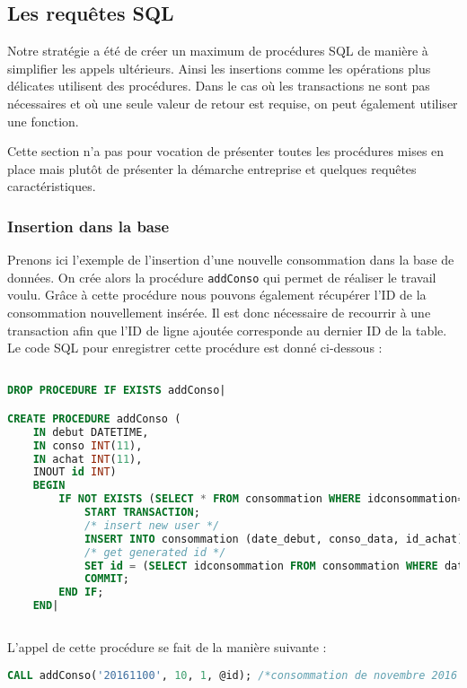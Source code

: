 \subsection{Les requêtes SQL}
Notre stratégie a été de créer un maximum de procédures SQL de manière à simplifier les appels ultérieurs. Ainsi les insertions comme les opérations plus délicates utilisent des procédures.
Dans le cas où les transactions ne sont pas nécessaires et où une seule valeur de retour est requise, on peut également utiliser une fonction.

Cette section n'a pas pour vocation de présenter toutes les procédures mises en place mais plutôt de présenter la démarche entreprise et quelques requêtes caractéristiques.
\subsubsection{Insertion dans la base}
Prenons ici l'exemple de l'insertion d'une nouvelle consommation dans la base de données. On crée alors la procédure \texttt{addConso} qui permet de réaliser le travail voulu. Grâce à cette procédure nous pouvons également récupérer l'ID de la consommation nouvellement insérée.
Il est donc nécessaire de recourrir à une transaction afin que l'ID de ligne ajoutée corresponde au dernier ID de la table. Le code SQL pour enregistrer cette procédure est donné ci-dessous :

\begin{lstlisting}[language=sql]

DROP PROCEDURE IF EXISTS addConso|

CREATE PROCEDURE addConso (
    IN debut DATETIME,
    IN conso INT(11),
    IN achat INT(11),
    INOUT id INT)
    BEGIN
        IF NOT EXISTS (SELECT * FROM consommation WHERE idconsommation=id AND date_debut=debut AND id_achat=achat) THEN
            START TRANSACTION;
			/* insert new user */
        	INSERT INTO consommation (date_debut, conso_data, id_achat) VALUES (debut, conso, achat);
			/* get generated id */
        	SET id = (SELECT idconsommation FROM consommation WHERE date_debut=debut AND conso_data=conso AND id_achat=achat ORDER BY idconsommation DESC LIMIT 1);
            COMMIT;
		END IF;
    END|
		
\end{lstlisting}

L'appel de cette procédure se fait de la manière suivante :

\begin{lstlisting}[language=sql]
CALL addConso('20161100', 10, 1, @id); /*consommation de novembre 2016 pour l'achat dont l'ID est 1*/
\end{lstlisting}

